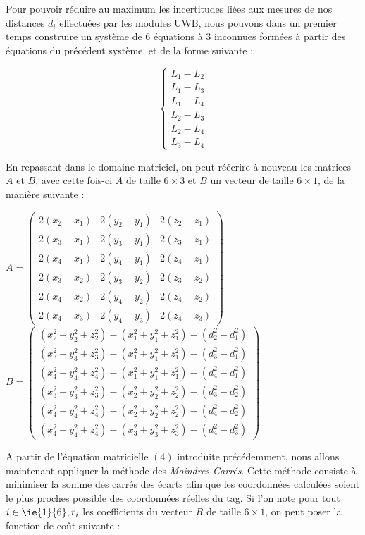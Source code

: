 Pour pouvoir réduire au maximum les incertitudes liées aux mesures de nos distances $d_i$ effectuées par les modules UWB, nous pouvons dans un premier temps construire un système de 6 équations à 3 inconnues formées à partir des équations du précédent système, et de la forme suivante :

\[
   \left\{
   \begin{aligned}
      L_1 - L_2 \\
      L_1 - L_3 \\
      L_1 - L_4 \\
      L_2 - L_3 \\
      L_2 - L_4 \\
      L_3 - L_4 
   \end{aligned}
   \right.
\]

En repassant dans le domaine matriciel, on peut réécrire à nouveau les matrices $A$ et $B$, avec cette fois-ci $A$ de taille $6 \times 3$ et $B$ un vecteur de taille $6 \times 1$, de la manière suivante : 

\bigskip

$A = \begin{pmatrix}
   2(x_2 - x_1) & 2(y_2 - y_1) & 2(z_2 - z_1) \\
   2(x_3 - x_1) & 2(y_3 - y_1) & 2(z_3 - z_1) \\
   2(x_4 - x_1) & 2(y_4 - y_1) & 2(z_4 - z_1) \\
   2(x_3 - x_2) & 2(y_3 - y_2) & 2(z_3 - z_2) \\
   2(x_4 - x_2) & 2(y_4 - y_2) & 2(z_4 - z_2) \\
   2(x_4 - x_3) & 2(y_4 - y_3) & 2(z_4 - z_3)
\end{pmatrix}$
$B = \begin{pmatrix}
   (x_2^2 + y_2^2 + z_2^2) - (x_1^2 + y_1^2 + z_1^2) - (d_2^2 - d_1^2) \\
   (x_3^2 + y_3^2 + z_3^2) - (x_1^2 + y_1^2 + z_1^2) - (d_3^2 - d_1^2) \\
   (x_4^2 + y_4^2 + z_4^2) - (x_1^2 + y_1^2 + z_1^2) - (d_4^2 - d_1^2) \\
   (x_3^2 + y_3^2 + z_3^2) - (x_2^2 + y_2^2 + z_2^2) - (d_3^2 - d_2^2) \\
   (x_4^2 + y_4^2 + z_4^2) - (x_2^2 + y_2^2 + z_2^2) - (d_4^2 - d_2^2) \\
   (x_4^2 + y_4^2 + z_4^2) - (x_3^2 + y_3^2 + z_3^2) - (d_4^2 - d_3^2)
\end{pmatrix}$

\bigskip

A partir de l'équation matricielle $(4)$ introduite précédemment, nous allons maintenant appliquer la méthode des \emph{Moindres Carrés}. Cette méthode consiste à minimiser la somme des carrés des écarts afin que les coordonnées calculées soient le plus proches possible des coordonnées réelles du tag. Si l'on note pour tout $i \in \ie{1}{6}, r_i$ les coefficients du vecteur $R$ de taille $6 \times 1$, on peut poser la fonction de coût suivante :

